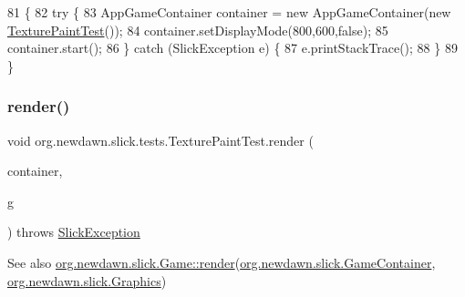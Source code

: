 \begin{DoxyCode}
81                                            \{
82         \textcolor{keywordflow}{try} \{
83             AppGameContainer container = \textcolor{keyword}{new} AppGameContainer(\textcolor{keyword}{new} 
      \mbox{\hyperlink{classorg_1_1newdawn_1_1slick_1_1tests_1_1_texture_paint_test_a2f80b6372e63d8906b0bb064b97847ea}{TexturePaintTest}}());
84             container.setDisplayMode(800,600,\textcolor{keyword}{false});
85             container.start();
86         \} \textcolor{keywordflow}{catch} (SlickException e) \{
87             e.printStackTrace();
88         \}
89     \}
\end{DoxyCode}
\mbox{\label{classorg_1_1newdawn_1_1slick_1_1tests_1_1_texture_paint_test_a51c7f49d67b05aabc0de200bf664f854}} 
\subsubsection{\texorpdfstring{render()}{render()}}
{\footnotesize\ttfamily void org.\+newdawn.\+slick.\+tests.\+Texture\+Paint\+Test.\+render (\begin{DoxyParamCaption}\item[{\mbox{\hyperlink{classorg_1_1newdawn_1_1slick_1_1_game_container}{Game\+Container}}}]{container,  }\item[{\mbox{\hyperlink{classorg_1_1newdawn_1_1slick_1_1_graphics}{Graphics}}}]{g }\end{DoxyParamCaption}) throws \mbox{\hyperlink{classorg_1_1newdawn_1_1slick_1_1_slick_exception}{Slick\+Exception}}\hspace{0.3cm}{\ttfamily [inline]}}

\begin{DoxySeeAlso}{See also}
\mbox{\hyperlink{interfaceorg_1_1newdawn_1_1slick_1_1_game_af1a4670d43eb3ba04dfcf55ab1975b64}{org.\+newdawn.\+slick.\+Game\+::render}}(\mbox{\hyperlink{classorg_1_1newdawn_1_1slick_1_1_game_container}{org.\+newdawn.\+slick.\+Game\+Container}}, \mbox{\hyperlink{classorg_1_1newdawn_1_1slick_1_1_graphics}{org.\+newdawn.\+slick.\+Graphics}}) 
\end{DoxySeeAlso}


